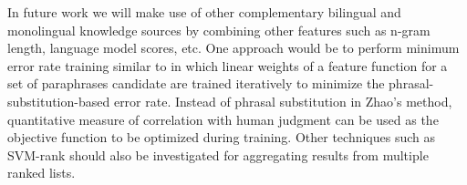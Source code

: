 \documentclass[11pt]{article}
\begin{document}
{{In future work we will make use of other complementary bilingual and monolingual knowledge sources by combining other features such as n-gram length, language model scores, etc. One approach would be to perform minimum error rate training similar to  in which linear weights of a feature function for a set of paraphrases candidate are trained iteratively to minimize the phrasal-substitution-based error rate. Instead of phrasal substitution in Zhao's method, quantitative measure of correlation with human judgment can be used as the objective function to be optimized during training. Other techniques such as SVM-rank \cite{Joachims02} should also be investigated for aggregating results from multiple ranked lists. 



}}
\end{document}
